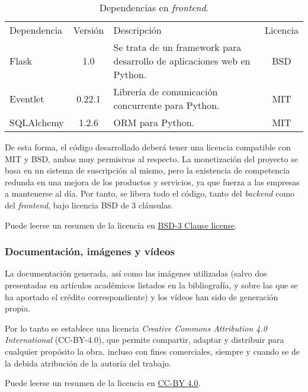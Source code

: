 \begin{table}[H]
\begin{center}
		\begin{tabular}{l  c m{6cm}  c}\hline
			\toprule
			Dependencia & Versión & Descripción & Licencia\\
			\otoprule
			Flask & 1.0 & Se trata de un framework para desarrollo de aplicaciones web en Python.  & BSD  \\
			Eventlet & 0.22.1 & Librería de comunicación concurrente para Python.  & MIT\\
			SQLAlchemy & 1.2.6 & ORM para Python. & MIT\\
			\hline
			\bottomrule
		\end{tabular}
		\caption{Dependencias en \emph{frontend}.}
		\label{tb:licensefrontend}
		\end{center}
\end{table}

De esta forma, el código desarrollado deberá tener una licencia compatible con MIT y BSD, ambas muy permisivas al respecto. 
La monetización del proyecto se basa en un sistema de suscripción al mismo, pero la existencia de competencia redunda en una mejora de los productos y servicios, ya que fuerza a las empresas a mantenerse al día.
Por tanto, se libera todo el código, tanto del \emph{backend} como del \emph{frontend}, bajo licencia BSD de 3 cláusulas.

Puede leerse un resumen de la licencia en \href{https://opensource.org/licenses/BSD-3-Clause}{BSD-3 Clause license}.

\subsubsection{Documentación, imágenes y vídeos}

La documentación generada, así como las imágenes utilizadas (salvo dos presentadas en artículos académicos listados en la bibliografía, y sobre las que se ha aportado el crédito correspondiente) y los vídeos han sido de generación propia. 

Por lo tanto se establece una licencia \emph{Creative Commons Attribution 4.0 International} (CC-BY-4.0), que permite compartir, adaptar y distribuir para cualquier propósito la obra, incluso con fines comerciales, siempre y cuando se de la debida atribución de la autoría del trabajo.

Puede leerse un resumen de la licencia en \href{https://creativecommons.org/licenses/by/4.0/}{CC-BY 4.0}. 


